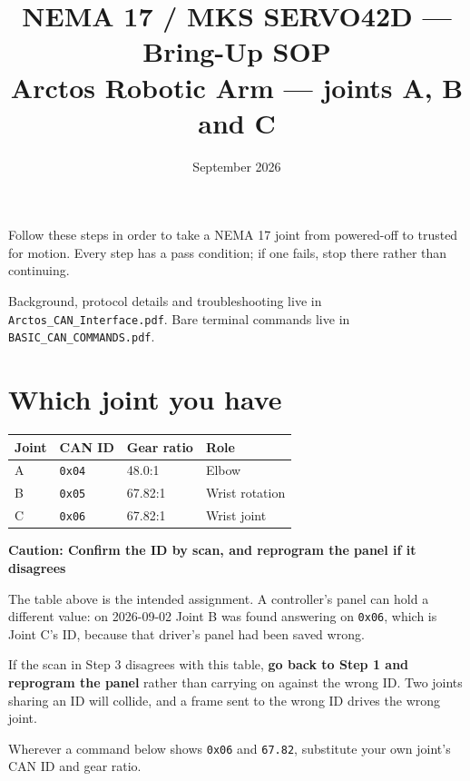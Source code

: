 \documentclass[11pt,letterpaper]{article}
\title{NEMA 17 / MKS SERVO42D --- Bring-Up SOP \\ \large Arctos Robotic Arm --- joints A, B and C}
\date{September 2026}
\newenvironment{caution}[1]{%
    \par\addvspace{8pt}%
    \noindent{\color{cautionred}\rule{\linewidth}{0.8pt}}\par\vspace{2pt}
    \noindent\textbf{\color{cautionred}Caution: #1}\par\vspace{2pt}
}{%
    \par\vspace{2pt}\noindent{\color{cautionred}\rule{\linewidth}{0.4pt}}%
    \par\addvspace{8pt}%
}
\begin{document}
\maketitle

Follow these steps in order to take a NEMA 17 joint from powered-off to trusted for
motion. Every step has a pass condition; if one fails, stop there rather than
continuing.

Background, protocol details and troubleshooting live in
\texttt{Arctos\_CAN\_Interface.pdf}. Bare terminal commands live in
\texttt{BASIC\_CAN\_COMMANDS.pdf}.

\section*{Which joint you have}

\begin{center}
\begin{tabular}{llll}
\toprule
\textbf{Joint} & \textbf{CAN ID} & \textbf{Gear ratio} & \textbf{Role} \\ \midrule
A & \texttt{0x04} & 48.0:1  & Elbow \\
B & \texttt{0x05} & 67.82:1 & Wrist rotation \\
C & \texttt{0x06} & 67.82:1 & Wrist joint \\
\bottomrule
\end{tabular}
\end{center}

\begin{caution}{Confirm the ID by scan, and reprogram the panel if it disagrees}
The table above is the intended assignment. A controller's panel can hold a
different value: on 2026-09-02 Joint B was found answering on \texttt{0x06}, which
is Joint C's ID, because that driver's panel had been saved wrong.

If the scan in Step 3 disagrees with this table, \textbf{go back to Step 1 and
reprogram the panel} rather than carrying on against the wrong ID. Two joints
sharing an ID will collide, and a frame sent to the wrong ID drives the wrong
joint.
\end{caution}

Wherever a command below shows \texttt{0x06} and \texttt{67.82}, substitute your own
joint's CAN ID and gear ratio.
\end{document}
